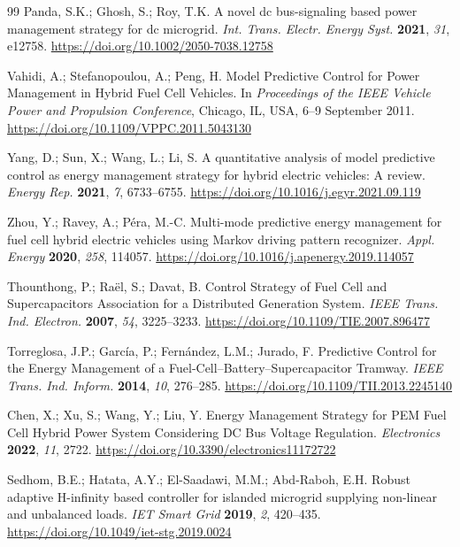\begin{thebibliography}{99}
Panda, S.K.; Ghosh, S.; Roy, T.K.
A novel dc bus-signaling based power management strategy for dc microgrid.
\emph{Int. Trans. Electr. Energy Syst.} \textbf{2021}, \emph{31}, e12758.
\url{https://doi.org/10.1002/2050-7038.12758}

Vahidi, A.; Stefanopoulou, A.; Peng, H.
Model Predictive Control for Power Management in Hybrid Fuel Cell Vehicles.
In \emph{Proceedings of the IEEE Vehicle Power and Propulsion Conference}, Chicago, IL, USA, 6--9 September 2011.
\url{https://doi.org/10.1109/VPPC.2011.5043130}

Yang, D.; Sun, X.; Wang, L.; Li, S.
A quantitative analysis of model predictive control as energy management strategy for hybrid electric vehicles: A review.
\emph{Energy Rep.} \textbf{2021}, \emph{7}, 6733--6755.
\url{https://doi.org/10.1016/j.egyr.2021.09.119}

Zhou, Y.; Ravey, A.; P\'{e}ra, M.-C.
Multi-mode predictive energy management for fuel cell hybrid electric vehicles using Markov driving pattern recognizer.
\emph{Appl. Energy} \textbf{2020}, \emph{258}, 114057.
\url{https://doi.org/10.1016/j.apenergy.2019.114057}

Thounthong, P.; Ra\"{e}l, S.; Davat, B.
Control Strategy of Fuel Cell and Supercapacitors Association for a Distributed Generation System.
\emph{IEEE Trans. Ind. Electron.} \textbf{2007}, \emph{54}, 3225--3233.
\url{https://doi.org/10.1109/TIE.2007.896477}

Torreglosa, J.P.; Garc\'{i}a, P.; Fern\'{a}ndez, L.M.; Jurado, F.
Predictive Control for the Energy Management of a Fuel-Cell--Battery--Supercapacitor Tramway.
\emph{IEEE Trans. Ind. Inform.} \textbf{2014}, \emph{10}, 276--285.
\url{https://doi.org/10.1109/TII.2013.2245140}

Chen, X.; Xu, S.; Wang, Y.; Liu, Y.
Energy Management Strategy for PEM Fuel Cell Hybrid Power System Considering DC Bus Voltage Regulation.
\emph{Electronics} \textbf{2022}, \emph{11}, 2722.
\url{https://doi.org/10.3390/electronics11172722}

Sedhom, B.E.; Hatata, A.Y.; El-Saadawi, M.M.; Abd-Raboh, E.H.
Robust adaptive H-infinity based controller for islanded microgrid supplying non-linear and unbalanced loads.
\emph{IET Smart Grid} \textbf{2019}, \emph{2}, 420--435.
\url{https://doi.org/10.1049/iet-stg.2019.0024}


\end{thebibliography}
